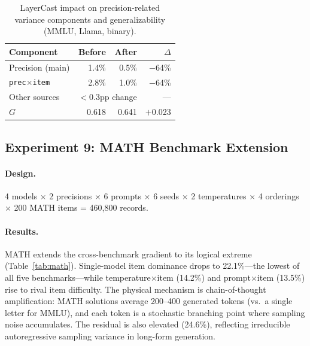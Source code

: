 \documentclass[letterpaper]{article}
\newcommand{\gcoeff}{\ensuremath{G}}
\newcommand{\pct}{\%}
\begin{document}
\begin{table}[t]
\centering
\caption{LayerCast impact on precision-related variance components and generalizability (MMLU, Llama, binary).}
\label{tab:layercast}
\small
\begin{tabular}{lrrr}
\toprule
Component & Before & After & $\Delta$ \\
\midrule
Precision (main)        & 1.4\pct{} & 0.5\pct{} & $-$64\pct{} \\
\texttt{prec$\times$item} & 2.8\pct{} & 1.0\pct{} & $-$64\pct{} \\
Other sources           & \multicolumn{2}{c}{$<$0.3pp change} & --- \\
\midrule
$\gcoeff{}$              & 0.618 & 0.641 & $+$0.023 \\
\bottomrule
\end{tabular}
\end{table}

\subsection{Experiment 9: MATH Benchmark Extension}

\paragraph{Design.}
4 models $\times$ 2 precisions $\times$ 6 prompts $\times$ 6 seeds $\times$ 2 temperatures $\times$ 4 orderings $\times$ 200 MATH items = 460,800 records.

\paragraph{Results.}
MATH extends the cross-benchmark gradient to its logical extreme (Table~\ref{tab:math}).
Single-model item dominance drops to 22.1\pct{}---the lowest of all five benchmarks---while temperature$\times$item (14.2\pct{}) and prompt$\times$item (13.5\pct{}) rise to rival item difficulty.
The physical mechanism is chain-of-thought amplification: MATH solutions average 200--400 generated tokens (vs.\ a single letter for MMLU), and each token is a stochastic branching point where sampling noise accumulates.
The residual is also elevated (24.6\pct{}), reflecting irreducible autoregressive sampling variance in long-form generation.
\end{document}

